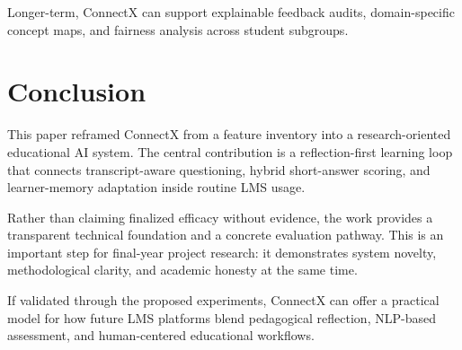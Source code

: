 \documentclass[conference]{IEEEtran}
\begin{document}
Longer-term, ConnectX can support explainable feedback audits, domain-specific concept maps, and fairness analysis across student subgroups.

\section{Conclusion}
This paper reframed ConnectX from a feature inventory into a research-oriented educational AI system. The central contribution is a reflection-first learning loop that connects transcript-aware questioning, hybrid short-answer scoring, and learner-memory adaptation inside routine LMS usage.

Rather than claiming finalized efficacy without evidence, the work provides a transparent technical foundation and a concrete evaluation pathway. This is an important step for final-year project research: it demonstrates system novelty, methodological clarity, and academic honesty at the same time.

If validated through the proposed experiments, ConnectX can offer a practical model for how future LMS platforms blend pedagogical reflection, NLP-based assessment, and human-centered educational workflows.
\end{document}
